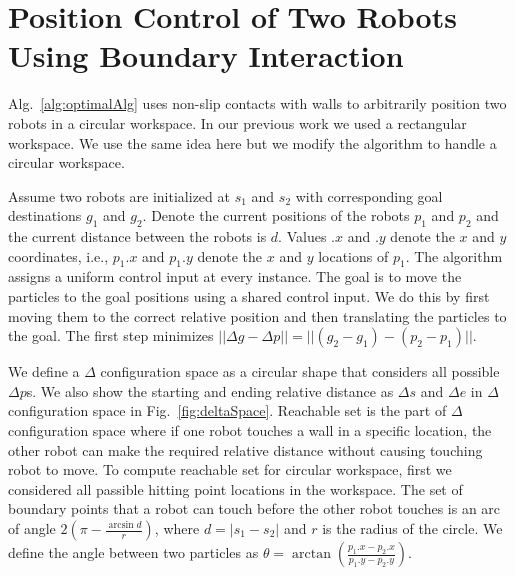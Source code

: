 

\section{Position Control of Two Robots Using Boundary Interaction}\label{sec:PostionControl2Robots}


Alg.~\ref{alg:optimalAlg} uses non-slip contacts with walls to arbitrarily position two robots in a circular workspace. In our previous work we used a rectangular workspace. We use the same idea here but we modify the algorithm to handle a circular workspace.

Assume two robots are initialized at $s_1$ and $s_2$ with corresponding goal destinations $g_1$ and $g_2$. 
Denote the current positions of the robots  $p_1$ and $p_2$ and the current distance between the robots is $d$.
Values $.x$ and $.y$ denote the $x$ and $y$ coordinates, i.e., $p_1.x$ and $p_1.y$ denote the $x$ and $y$ locations of $p_1$. 
The algorithm assigns a uniform control input at every instance.
The goal is to move the particles to the goal positions using a shared control input. We do this by first moving them to the correct relative position and then translating the particles to the goal. The first step minimizes  
 $||\Delta g - \Delta p || = ||(g_2-g_1)- (p_2-p_1)||$. 
 
 We define a $\Delta$ configuration space as a circular shape that considers all possible $\Delta p$s. We also show the starting and ending relative distance as $\Delta s$ and $\Delta e$ in $\Delta$ configuration space in Fig.~\ref{fig:deltaSpace}. Reachable set is the part of $\Delta$ configuration space where if one robot touches a wall in a specific location, the other robot can make the required relative distance without causing touching robot to move. To compute reachable set for circular workspace, first we considered all passible hitting point locations in the workspace. 
 The set of boundary points that a robot can touch before the  other robot  touches is an arc of angle $2(\pi - \frac{\arcsin{d}}{r})$, where $d= |s_1 - s_2|$ and $r$ is the radius of the circle.
 We define the angle between two particles as $\theta = \arctan(\frac{p_1.x-p_2.x}{p_1.y - p_2.y})$. 
 
